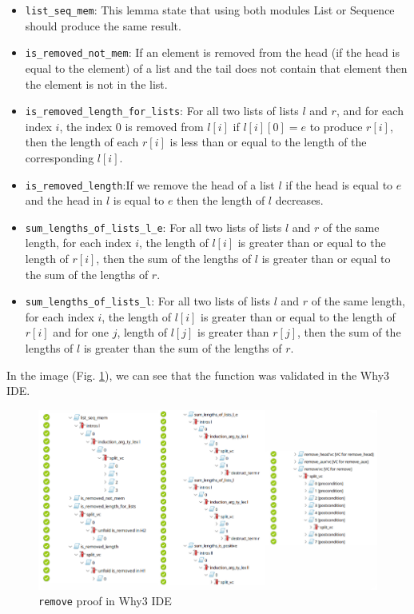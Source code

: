 \documentclass[runningheads]{llncs}
\begin{document}
\begin{itemize}
  \item \texttt{list\_seq\_mem}: This lemma state that using both modules List or Sequence should produce the same result.
  \item \texttt{is\_removed\_not\_mem}: If an element is removed from the head (if the head is equal to the element) of a list and the tail does not contain that element then the element is not in the list.
  \item \texttt{is\_removed\_length\_for\_lists}: For all two lists of lists $l$ and $r$, and for each index $i$, the index $0$ is removed from $l[i]$ if $l[i][0] = e$ to produce $r[i]$, then the length of each $r[i]$ is less than or equal to the length of the corresponding $l[i]$.
  \item \texttt{is\_removed\_length}:If we remove the head of a list $l$ if the head is equal to $e$ and the head in $l$ is equal to $e$ then the length of $l$ decreases.
  \item \texttt{sum\_lengths\_of\_lists\_l\_e}: For all two lists of lists $l$ and $r$ of the same length, for each index $i$, the length of $l[i]$ is greater than or equal to the length of $r[i]$, then the sum of the lengths of $l$ is greater than or equal to the sum of the lengths of $r$.
  \item \texttt{sum\_lengths\_of\_lists\_l}: For all two lists of lists $l$ and $r$ of the same length, for each index $i$, the length of $l[i]$ is greater than or equal to the length of $r[i]$ and for one $j$, length of $l[j]$ is greater than $r[j]$, then the sum of the lengths of $l$ is greater than the sum of the lengths of $r$.
\end{itemize}
In the image (Fig. \ref{fig:Why3Remove}), we can see that the function was validated in the Why3 IDE.
\begin{figure}[htbp]
  \centering
  \includegraphics[width=1\textwidth]{images/removeWhy3IDE.png}
  \caption{\texttt{remove} proof in Why3 IDE}
  \label{fig:Why3Remove} 
\end{figure}
\end{document}
